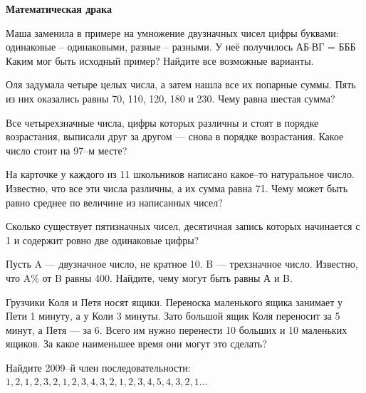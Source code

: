 \hspace{3mm}

\centerline{\bf \Huge Математическая драка}

Маша заменила в примере на умножение двузначных чисел цифры буквами: одинаковые – одинаковыми, разные – разными. У неё получилось АБ$\cdot$ВГ = БББ Каким мог быть исходный пример? Найдите все возможные варианты.

Оля задумала четыре целых числа, а затем нашла все их попарные суммы. Пять из них оказались равны 70, 110, 120, 180 и 230. Чему равна шестая сумма?

Все четырехзначные числа, цифры которых различны и стоят в порядке возрастания, выписали друг за другом — снова в порядке возрастания. Какое число стоит на 97–м месте?

На карточке у каждого из 11 школьников написано какое–то натуральное число. Известно, что все эти числа различны, а их сумма равна 71. Чему может быть равно среднее по величине из написанных чисел?

Сколько существует пятизначных чисел, десятичная запись которых начинается с 1 и содержит ровно две одинаковые цифры?

Пусть A — двузначное число, не кратное 10. B — трехзначное число. Известно, что A\% от B равны 400. Найдите, чему могут быть равны А и B.

Грузчики Коля и Петя носят ящики. Переноска маленького ящика занимает у Пети 1 минуту, а у Коли 3 минуты. Зато большой ящик Коля переносит за 5 минут, а Петя — за 6. Всего им нужно перенести 10 больших и 10 маленьких ящиков. За какое наименьшее время они могут это сделать?

Найдите 2009–й член последовательности: $1, 2, 1, 2, 3, 2, 1, 2, 3, 4, 3, 2, 1, 2, 3, 4, 5, 4, 3, 2, 1\ldots$
